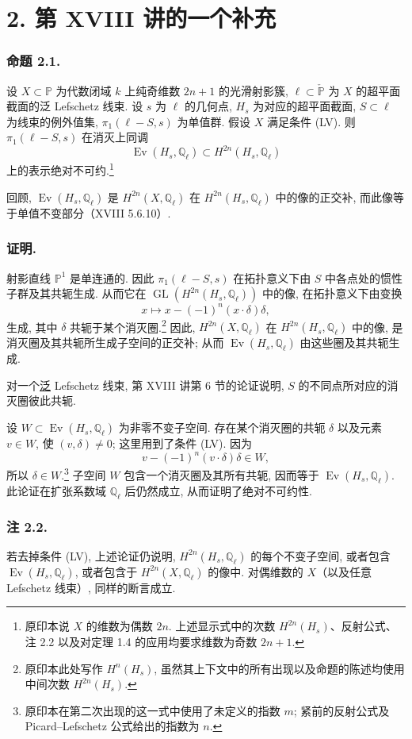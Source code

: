 \section*{2. 第 XVIII 讲的一个补充}

\subsubsection*{命题 2.1.}
设 $X\subset\mathbb P$ 为代数闭域 $k$ 上纯奇维数 $2n+1$ 的光滑射影簇, $\ell\subset\check{\mathbb P}$ 为 $X$ 的超平面截面的泛 Lefschetz 线束. 设 $s$ 为 $\ell$ 的几何点, $H_s$ 为对应的超平面截面, $S\subset\ell$ 为线束的例外值集, $\pi_1(\ell-S,s)$ 为单值群. 假设 $X$ 满足条件 (LV). 则 $\pi_1(\ell-S,s)$ 在消灭上同调
\[
\operatorname{Ev}(H_s,\mathbb Q_\ell)
\subset H^{2n}(H_s,\mathbb Q_\ell)
\]
上的表示绝对不可约.\footnote{原印本说 $X$ 的维数为偶数 $2n$. 上述显示式中的次数 $H^{2n}(H_s)$、反射公式、注 2.2 以及对定理 1.4 的应用均要求维数为奇数 $2n+1$.}

回顾, $\operatorname{Ev}(H_s,\mathbb Q_\ell)$ 是 $H^{2n}(X,\mathbb Q_\ell)$ 在 $H^{2n}(H_s,\mathbb Q_\ell)$ 中的像的正交补, 而此像等于单值不变部分（XVIII 5.6.10）.

\subsubsection*{证明.}
射影直线 $\mathbb P^1$ 是单连通的. 因此 $\pi_1(\ell-S,s)$ 在拓扑意义下由 $S$ 中各点处的惯性子群及其共轭生成. 从而它在 $\operatorname{GL}(H^{2n}(H_s,\mathbb Q_\ell))$ 中的像, 在拓扑意义下由变换
\[
x\longmapsto x-(-1)^n(x\cdot\delta)\delta,
\]
生成, 其中 $\delta$ 共轭于某个消灭圈.\footnote{原印本此处写作 $H^n(H_s)$, 虽然其上下文中的所有出现以及命题的陈述均使用中间次数 $H^{2n}(H_s)$.}
因此, $H^{2n}(X,\mathbb Q_\ell)$ 在 $H^{2n}(H_s,\mathbb Q_\ell)$ 中的像, 是消灭圈及其共轭所生成子空间的正交补; 从而 $\operatorname{Ev}(H_s,\mathbb Q_\ell)$ 由这些圈及其共轭生成.

对一个\underline{泛} Lefschetz 线束, 第 XVIII 讲第 6 节的论证说明, $S$ 的不同点所对应的消灭圈彼此共轭.

设 $W\subset\operatorname{Ev}(H_s,\mathbb Q_\ell)$ 为非零不变子空间. 存在某个消灭圈的共轭 $\delta$ 以及元素 $v\in W$, 使 $(v,\delta)\ne0$; 这里用到了条件 (LV). 因为
\[
v-(-1)^n(v\cdot\delta)\delta\in W,
\]
所以 $\delta\in W$.\footnote{原印本在第二次出现的这一式中使用了未定义的指数 $m$; 紧前的反射公式及 Picard--Lefschetz 公式给出的指数为 $n$.} 子空间 $W$ 包含一个消灭圈及其所有共轭, 因而等于 $\operatorname{Ev}(H_s,\mathbb Q_\ell)$. 此论证在扩张系数域 $\mathbb Q_\ell$ 后仍然成立, 从而证明了绝对不可约性.

\subsubsection*{注 2.2.}
若去掉条件 (LV), 上述论证仍说明, $H^{2n}(H_s,\mathbb Q_\ell)$ 的每个不变子空间, 或者包含 $\operatorname{Ev}(H_s,\mathbb Q_\ell)$, 或者包含于 $H^{2n}(X,\mathbb Q_\ell)$ 的像中. 对偶维数的 $X$（以及任意 Lefschetz 线束）, 同样的断言成立.
